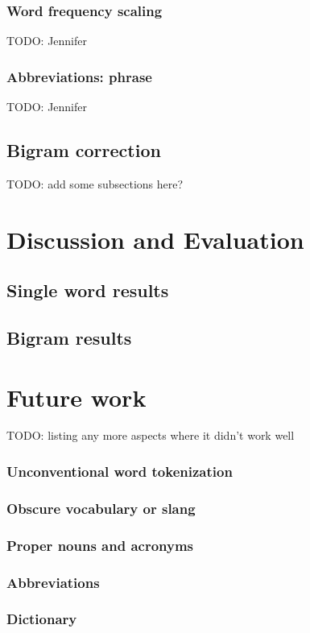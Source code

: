 \documentclass[10pt]{article}
\begin{document}
\subsubsection*{Word frequency scaling}
TODO: Jennifer
\subsubsection*{Abbreviations: phrase}
TODO: Jennifer
\subsection*{Bigram correction}
TODO: add some subsections here?
\section*{Discussion and Evaluation}
\subsection*{Single word results}
\subsection*{Bigram results}
\section*{Future work}
TODO: listing any more aspects where it didn't work well
\subsubsection*{Unconventional word tokenization}
\subsubsection*{Obscure vocabulary or slang}
\subsubsection*{Proper nouns and acronyms}
\subsubsection*{Abbreviations}
\subsubsection*{Dictionary}
\end{document}
